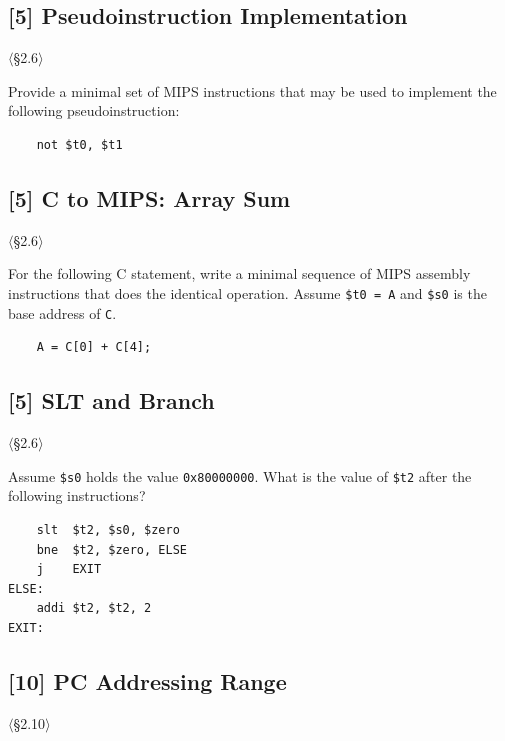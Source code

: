 \problembreak

\subsection{[5] Pseudoinstruction Implementation}
\hypertarget{prob-2.19}{}
\noindent$\langle$\S2.6$\rangle$\medskip

\noindent Provide a minimal set of MIPS instructions that may be used to
implement the following pseudoinstruction:
\begin{verbatim}
    not $t0, $t1
\end{verbatim}

\problembreak

\subsection{[5] C to MIPS: Array Sum}
\hypertarget{prob-2.20}{}
\noindent$\langle$\S2.6$\rangle$\medskip

\noindent For the following C statement, write a minimal sequence of MIPS
assembly instructions that does the identical operation. Assume
\texttt{\$t0 = A} and \texttt{\$s0} is the base address of \texttt{C}.
\begin{verbatim}
    A = C[0] + C[4];
\end{verbatim}

\problembreak

\subsection{[5] SLT and Branch}
\hypertarget{prob-2.21}{}
\noindent$\langle$\S2.6$\rangle$\medskip

\noindent Assume \texttt{\$s0} holds the value \texttt{0x80000000}. What is
the value of \texttt{\$t2} after the following instructions?
\begin{verbatim}
    slt  $t2, $s0, $zero
    bne  $t2, $zero, ELSE
    j    EXIT
ELSE:
    addi $t2, $t2, 2
EXIT:
\end{verbatim}

\problembreak

\subsection{[10] PC Addressing Range}
\hypertarget{prob-2.22}{}
\noindent$\langle$\S2.10$\rangle$\medskip

